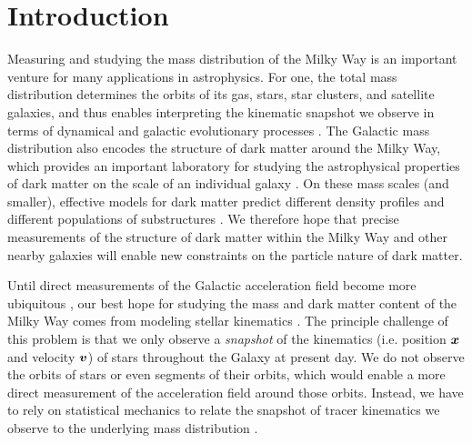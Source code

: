 
\section{Introduction} \label{sec:intro}


Measuring and studying the mass distribution of the Milky Way is an important venture
for many applications in astrophysics.
For one, the total mass distribution determines the orbits of its gas, stars, star
clusters, and satellite galaxies, and thus enables interpreting the kinematic snapshot
we observe in terms of dynamical and galactic evolutionary processes
\citep[e.g.,][]{Freeman:2002,Helmi:2020}.
The Galactic mass distribution also encodes the structure of dark matter around the
Milky Way, which provides an important laboratory for studying the astrophysical
properties of dark matter on the scale of an individual galaxy
\citep[e.g.,][]{Bertone:2005, Buckley:2018}.
On these mass scales (and smaller), effective models for dark matter predict different
density profiles and different populations of substructures
\citep[e.g.,][]{Bullock:2017}.
We therefore hope that precise measurements of the structure of dark matter within the
Milky Way and other nearby galaxies will enable new constraints on the particle nature
of dark matter.

Until direct measurements of the Galactic acceleration field become more ubiquitous
\citep{Klioner:2021, Chakrabarti:2021}, our best hope for studying the mass and dark
matter content of the Milky Way comes from modeling stellar kinematics
\citep[e.g.,][]{Oort:1932, Binney:2008, Rix:2013}.
The principle challenge of this problem is that we only observe a \emph{snapshot} of the
kinematics (i.e. position $\boldsymbol{x}$ and velocity $\boldsymbol{v}$) of stars throughout the Galaxy
at present day.
We do not observe the orbits of stars or even segments of their orbits, which would
enable a more direct measurement of the acceleration field around those orbits.
Instead, we have to rely on statistical mechanics to relate the snapshot of tracer
kinematics we observe to the underlying mass distribution \citep[e.g.,][]{Kuijken:1989a,
Binney:2008, Magorrian:2014}.

